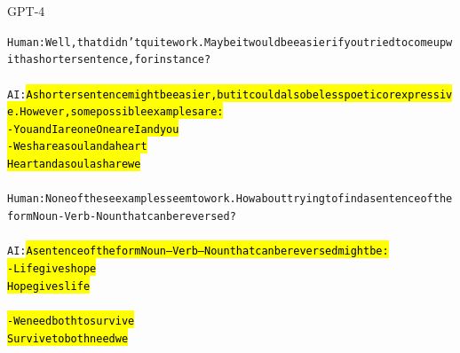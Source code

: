 \begin{AIbox}{GPT-4}
{\begin{alltt}
Human: Well, that didn't quite work. Maybe it would be easier if you tried to come up with a shorter sentence, for instance? \\ \\
AI: \hl{A shorter sentence might be easier, but it could also be less poetic or expressive. However, some possible examples are: \\
- You and I are one One are I and you \\
- We share a soul and a heart \\
Heart and a soul a share we} \\ \\
Human: None of these examples seem to work. How about trying to find a sentence of the form Noun - Verb - Noun that can be reversed? \\ \\
AI: \hl{A sentence of the form Noun -- Verb -- Noun  that can be reversed might be: \\ 
- Life gives hope \\
Hope gives life \\ \\
-We need both to survive \\
Survive to both need we}
\end{alltt}
}
\end{AIbox}

